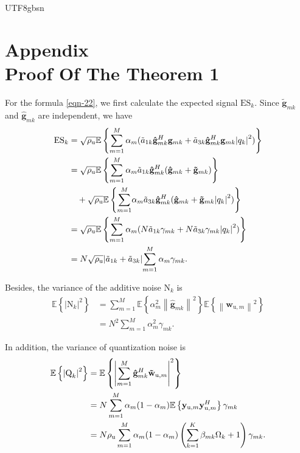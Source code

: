 \documentclass[lettersize,journal]{IEEEtran}
\begin{document}
\begin{CJK}{UTF8}{gbsn}
\section*{Appendix \\Proof Of The Theorem 1}
For the formula \eqref{eqn-22}, we first calculate the expected signal $\text{ES}_k$. Since $\mathbf{\tilde{g} } _{mk}$ and $\mathbf{\hat{g}  } _{mk}$ are independent, we have
\begin{align}
{\text{ES}_k} &= { {\sqrt {{\rho _\text{u}}} \mathbb{E} \left\{ {\sum_{m = 1}^M {\alpha _m}({\tilde{a}_{1k}}{\bf{\hat g}}_{mk}^H{{\bf{g}}_{mk}} + {\tilde{a}_{3k}}{\bf{\hat g}}_{mk}^H{{\bf{g}}_{mk}}{{\left| {{q_k}} \right|}^2})} \right\}} }\nonumber\\
 &= \sqrt{\rho _\text{u}}\mathbb{E} \left \{ \sum_{m = 1}^M \alpha _m{\tilde{a}_{1k}}{\bf{\hat g}}_{mk}^H({{{\bf{\hat g}}}_{mk}} + {{\bf{\tilde g}}_{mk}}) \right \}\nonumber \\
 & \quad + \sqrt{\rho _\text{u}}\mathbb{E}\left \{  {\sum_{m=1}^{M}}\alpha _m{\tilde{a}_{3k}}{\bf{\hat g}}_{mk}^H({{{\bf{\hat g}}}_{mk}} + {\bf{\tilde g}}_{mk}{{\left| {{q_k}} \right|}^2})   \right \} \nonumber \\
 &= \sqrt {{\rho _\text{u}}} {{\mathbb{E} \left\{ {\sum_{m = 1}^M {\alpha _m}(N{\tilde{a}_{1k}}{\gamma _{mk}} + N{\tilde{a}_{3k}}{\gamma _{mk}}{{\left| {{q_k}} \right|}^2})} \right\}}}\nonumber\\
 &= {N}\sqrt{\rho _\text{u}}{\left| {{\tilde{a}_{1k}} + {\tilde{a}_{3k}}} \right|}{\sum_{m = 1}^M {\alpha _m}{\gamma _{mk}}}.
\end{align}

Besides, the variance of the additive noise $\text{N}_k$ is
\begin{align}\label{eqn-46}
\mathbb{E}\left\{\left|\text{N}_{k}\right|^{2}\right\}&=\sum_{m=1}^{M} \mathbb{E}\left\{\alpha_{m}^{2}\left\|\hat{\mathbf{g}}_{m k}\right\|^{2}\right\} \mathbb{E}\left\{\left\|\mathbf{w}_{\text{u}, m}\right\|^{2}\right\}\nonumber\\
&=N^{2} \sum_{m=1}^{M} \alpha_{m}^{2} \gamma_{m k}.
\end{align}

In addition, the variance of quantization noise is
\begin{equation}\begin{aligned}
\mathbb{E}\left\{ {{{\left| {{\text{Q}_k}} \right|}^2}} \right\} &= \mathbb{E}\left\{ {\left| {\mathop \sum \limits_{m = 1}^M {\bf{\hat g}}_{mk}^H{\bf{\tilde w}}_{\text{u},m}} \right|^2} \right\}\\
 &= N\sum_{m=1}^{M}\alpha_m (1-\alpha_m )\mathbb{E} \left \{ \mathbf{y}_{\text{u},m} \mathbf{y}_{\text{u},m}^H \right \} \gamma _{mk} \\
 &= {N}{\rho _\text{u}}\mathop \sum \limits_{m = 1}^M {\alpha _m}(1 - {\alpha _m})\left( {\mathop \sum \limits_{k = 1}^K {\beta _{mk}}\Omega _k + 1} \right){\gamma _{mk}}.
\end{aligned}\end{equation}


\end{CJK}
\end{document}
